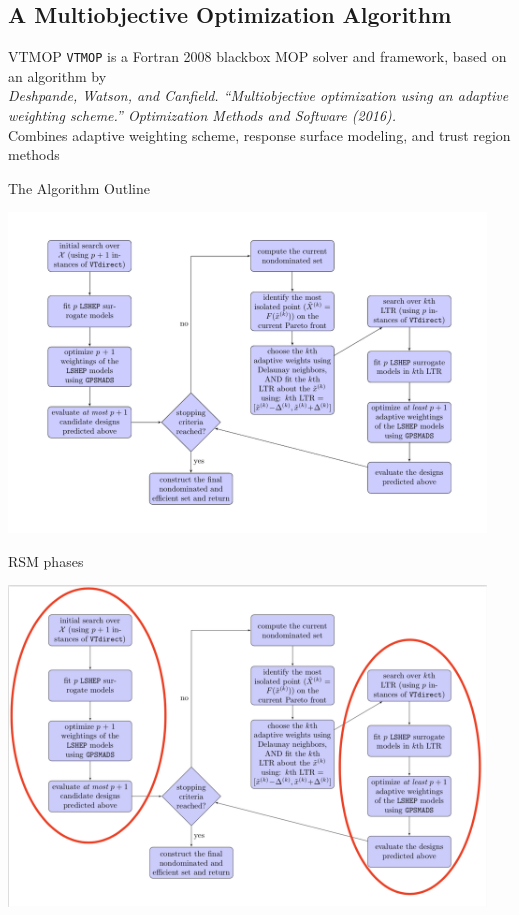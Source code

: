 \documentclass[xcolor=dvipsnames]{beamer}
\begin{document}
\subsection{A Multiobjective Optimization Algorithm}
\begin{frame}{VTMOP}
\texttt{VTMOP} is a Fortran 2008 blackbox MOP solver and framework,
based on an algorithm by\\
\medskip
{ \small \it Deshpande, Watson, and Canfield.
``Multiobjective optimization using an adaptive weighting scheme.''
Optimization Methods and Software (2016).}\\
\medskip
Combines adaptive weighting scheme, response surface modeling, and trust
region methods
\end{frame}
\begin{frame}{The Algorithm Outline}
\begin{center}
\includegraphics[width=0.95\textwidth]{algorithm-chart.pdf}
\end{center}
\end{frame}
\begin{frame}{RSM phases}
\begin{center}
\includegraphics[width=0.95\textwidth]{rsm-chart.png}
\end{center}
\end{frame}
\end{document}
